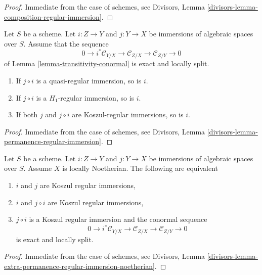 \begin{proof}
Immediate from the case of schemes, see
Divisors, Lemma \ref{divisors-lemma-composition-regular-immersion}.
\end{proof}

\begin{lemma}
\label{lemma-permanence-regular-immersion}
Let $S$ be a scheme. Let $i : Z \to Y$ and $j : Y \to X$ be immersions of
algebraic spaces over $S$. Assume that the sequence
$$
0 \to i^*\mathcal{C}_{Y/X} \to
\mathcal{C}_{Z/X} \to
\mathcal{C}_{Z/Y} \to 0
$$
of Lemma \ref{lemma-transitivity-conormal} is exact and locally split.
\begin{enumerate}
\item If $j \circ i$ is a quasi-regular immersion, so is $i$.
\item If $j \circ i$ is a $H_1$-regular immersion, so is $i$.
\item If both $j$ and $j \circ i$ are Koszul-regular immersions, so is $i$.
\end{enumerate}
\end{lemma}

\begin{proof}
Immediate from the case of schemes, see
Divisors, Lemma \ref{divisors-lemma-permanence-regular-immersion}.
\end{proof}

\begin{lemma}
\label{lemma-extra-permanence-regular-immersion-noetherian}
Let $S$ be a scheme. Let $i : Z \to Y$ and $j : Y \to X$ be immersions of
algebraic spaces over $S$. Assume $X$ is locally Noetherian.
The following are equivalent
\begin{enumerate}
\item $i$ and $j$ are Koszul regular immersions,
\item $i$ and $j \circ i$ are Koszul regular immersions,
\item $j \circ i$ is a Koszul regular immersion and the conormal sequence
$$
0 \to i^*\mathcal{C}_{Y/X} \to
\mathcal{C}_{Z/X} \to
\mathcal{C}_{Z/Y} \to 0
$$
is exact and locally split.
\end{enumerate}
\end{lemma}

\begin{proof}
Immediate from the case of schemes, see Divisors, Lemma
\ref{divisors-lemma-extra-permanence-regular-immersion-noetherian}.
\end{proof}














